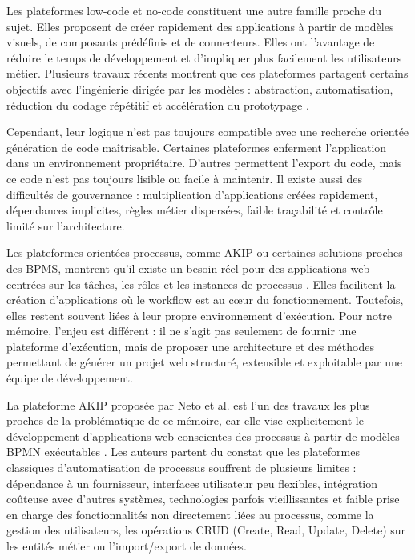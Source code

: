 Les plateformes low-code et no-code constituent une autre famille proche
du sujet. Elles proposent de créer rapidement des applications à partir
de modèles visuels, de composants prédéfinis et de connecteurs. Elles
ont l'avantage de réduire le temps de développement et d'impliquer plus
facilement les utilisateurs métier. Plusieurs travaux récents montrent
que ces plateformes partagent certains objectifs avec l'ingénierie
dirigée par les modèles : abstraction, automatisation, réduction du
codage répétitif et accélération du prototypage \cite{diruscio2022,bucaioni2022}.

Cependant, leur logique n'est pas toujours compatible avec une recherche
orientée génération de code maîtrisable. Certaines plateformes enferment
l'application dans un environnement propriétaire. D'autres permettent
l'export du code, mais ce code n'est pas toujours lisible ou facile à
maintenir. Il existe aussi des difficultés de gouvernance :
multiplication d'applications créées rapidement, dépendances implicites,
règles métier dispersées, faible traçabilité et contrôle limité sur
l'architecture.

Les plateformes orientées processus, comme AKIP ou certaines solutions
proches des BPMS, montrent qu'il existe un besoin réel pour des
applications web centrées sur les tâches, les rôles et les instances de
processus \cite{neto2022}. Elles facilitent la création d'applications où le
workflow est au cœur du fonctionnement. Toutefois, elles restent souvent
liées à leur propre environnement d'exécution. Pour notre mémoire,
l'enjeu est différent : il ne s'agit pas seulement de fournir une
plateforme d'exécution, mais de proposer une architecture et des
méthodes permettant de générer un projet web structuré, extensible et
exploitable par une équipe de développement.

La plateforme AKIP proposée par Neto et al. est l'un des travaux les
plus proches de la problématique de ce mémoire, car elle vise
explicitement le développement d'applications web conscientes des
processus à partir de modèles BPMN exécutables \cite{neto2022}. Les auteurs
partent du constat que les plateformes classiques d'automatisation de
processus souffrent de plusieurs limites : dépendance à un fournisseur,
interfaces utilisateur peu flexibles, intégration coûteuse avec d'autres
systèmes, technologies parfois vieillissantes et faible prise en charge
des fonctionnalités non directement liées au processus, comme la gestion
des utilisateurs, les opérations CRUD (Create, Read, Update, Delete) sur
les entités métier ou l'import/export de données.

